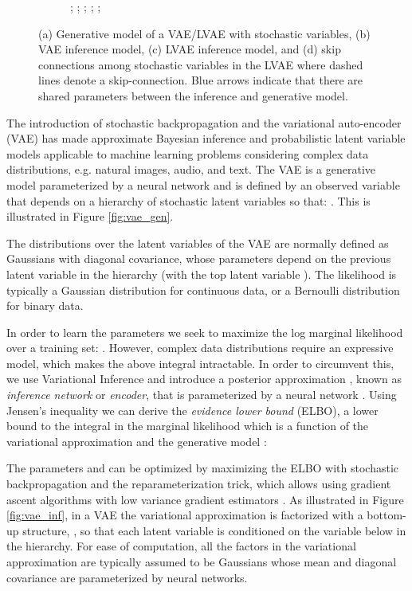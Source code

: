 \documentclass{article}
\begin{document}
\begin{wrapfigure}{R}{0.5\textwidth}
\begin{subfigure}{0.14\textwidth}
{;
     ;
     ;
     ;
     ;
     }
     \caption{ }\label{fig:lvae_inf_skip}
\end{subfigure}
\caption{(a) Generative model of a VAE/LVAE with  stochastic variables, (b) VAE inference model, (c) LVAE inference model, and (d) skip connections among stochastic variables in the LVAE where dashed lines denote a skip-connection. {\color{blue} Blue} arrows indicate that there are shared parameters between the inference and generative model.}
\vspace{-0.8cm}
\label{fig:vaelvae}
\end{wrapfigure}

The introduction of stochastic backpropagation \citep{Paisley2012,Hoffman2013} and the variational auto-encoder (VAE) \citep{Kingma13,Rezende14} has made approximate Bayesian inference and probabilistic latent variable models applicable to machine learning problems considering complex data distributions, e.g. natural images, audio, and text. The VAE is a generative model parameterized by a neural network  and is defined by an observed variable  that depends on a hierarchy of stochastic latent variables  so that: .
This is illustrated in Figure \ref{fig:vae_gen}.

The distributions  over the latent variables of the VAE are normally defined as Gaussians with diagonal covariance, whose parameters depend on the previous latent variable in the hierarchy (with the top latent variable ). The likelihood  is typically a Gaussian distribution for continuous data, or a Bernoulli distribution for binary data.

In order to learn the parameters  we seek to maximize the log marginal likelihood over a training set: .
However, complex data distributions require an expressive model, which makes the above integral intractable. In order to circumvent this, we use Variational Inference \citep{Jordan99} and introduce a posterior approximation , known as \textit{inference network} or \textit{encoder}, that is parameterized by a neural network . Using Jensen's inequality we can derive the \textit{evidence lower bound} (ELBO), a lower bound to the integral in the marginal likelihood which is a function of the variational approximation  and the generative model :

The parameters  and  can be optimized by maximizing the ELBO with stochastic backpropagation and the reparameterization trick, which allows using gradient ascent algorithms with low variance gradient estimators \citep{Kingma13, Rezende14}. 
As illustrated in Figure \ref{fig:vae_inf}, in a VAE the variational approximation is factorized with a bottom-up structure, , 
so that each latent variable is conditioned on the variable below in the hierarchy. For ease of computation, all the factors in the variational approximation are typically assumed to be Gaussians whose mean and diagonal covariance are parameterized by neural networks.
\end{document}
